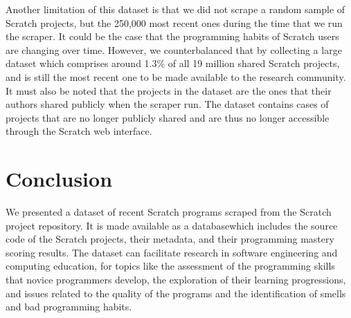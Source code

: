 \documentclass[10pt, conference]{IEEEtran}
\begin{document}
Another limitation of this dataset is that we did not scrape a random sample of Scratch projects, but the 250,000 most recent ones during the time that we run the scraper.
It could be the case that the programming habits of Scratch users are changing over time.
However, we counterbalanced that by collecting a large dataset which comprises around 1.3\% of all 19 million shared Scratch projects, and is still the most recent one to be made available to the research community.
It must also be noted that the projects in the dataset are the ones that their authors shared publicly when the scraper run. The dataset contains cases of projects that are no longer publicly shared and are thus no longer accessible through the Scratch web interface.

\section{Conclusion}
We presented a dataset of recent Scratch programs scraped from the Scratch project repository.
It is made available as a database\footnotemark[\ref{dataseturl}] which includes the source code of the Scratch projects, their metadata, and their programming mastery scoring results.
The dataset can facilitate research in software engineering and computing education, for topics like the assessment of the programming skills that novice programmers develop, the exploration of their learning progressions, and issues related to the quality of the programs and the identification of smells and bad programming habits.



\end{document}
